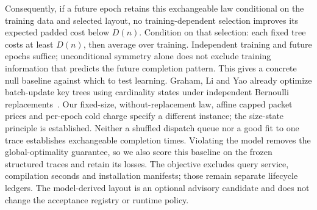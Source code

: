 Consequently, if a future epoch retains this exchangeable law conditional
on the training data and selected layout, no training-dependent selection
improves its expected padded cost below $D(n)$. Condition on that selection:
each fixed tree costs at least $D(n)$, then average over training. Independent
training and future epochs suffice; unconditional symmetry alone does not
exclude training information that predicts the future completion pattern.
This gives a concrete null baseline against which to test learning.
Graham, Li and Yao already optimize batch-update key trees using cardinality
states under independent Bernoulli replacements~\cite{graham2007}.
Our fixed-size, without-replacement law, affine capped packet prices and
per-epoch cold charge specify a different instance; the size-state principle
is established. Neither a shuffled dispatch queue nor a good
fit to one trace establishes exchangeable completion times. Violating the
model removes the global-optimality guarantee, so we also score this baseline
on the frozen structured traces and retain its losses. The objective excludes
query service, compilation seconds and installation manifests; those remain
separate lifecycle ledgers. The model-derived layout is an optional advisory
candidate and does not change the acceptance registry or runtime policy.
